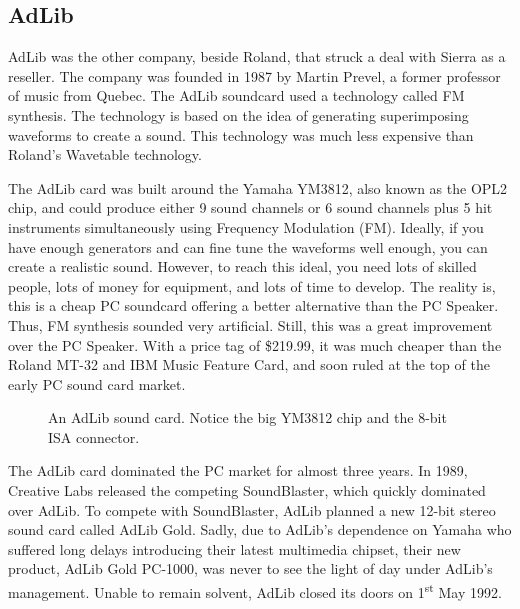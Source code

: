 \documentclass[book.tex]{subfiles}
\begin{document}
 \subsection{AdLib}
AdLib was the other company, beside Roland, that struck a deal with Sierra as a reseller. The company was founded in 1987 by Martin Prevel, a former professor of music from Quebec. The AdLib soundcard used a technology called FM synthesis. The technology is based on the idea of generating superimposing waveforms to create a sound. This technology was much less expensive than Roland's Wavetable technology.\\

\par
The AdLib card was built around the Yamaha YM3812, also known as the OPL2 chip, and could produce either 9 sound channels or 6 sound channels plus 5 hit instruments simultaneously using Frequency Modulation (FM). Ideally, if you have enough generators and can fine tune the waveforms well enough, you can create a realistic sound. However, to reach this ideal, you need lots of skilled people, lots of money for equipment, and lots of time to develop. The reality is, this is a cheap PC soundcard offering a better alternative than the PC Speaker. Thus, FM synthesis sounded very artificial. Still, this was a great improvement over the PC Speaker. With a price tag of \$219.99, it was much cheaper than the Roland MT-32 and IBM Music Feature Card, and soon ruled at the top of the early PC sound card market.\\

\par
  \begin{figure}[H] 
    \centering 
    \caption{An AdLib sound card. Notice the big YM3812 chip and the 8-bit ISA connector.}
  \end{figure}

\par
The AdLib card dominated the PC market for almost three years. In 1989, Creative Labs released the competing SoundBlaster, which quickly dominated over AdLib. To compete with SoundBlaster, AdLib planned a new 12-bit stereo sound card called AdLib Gold. Sadly, due to AdLib's dependence on Yamaha who suffered long delays introducing their latest multimedia chipset, their new product, AdLib Gold PC-1000, was never to see the light of day under AdLib's management. Unable to remain solvent, AdLib closed its doors on 1\textsuperscript{st} May 1992.\\
\end{document}
